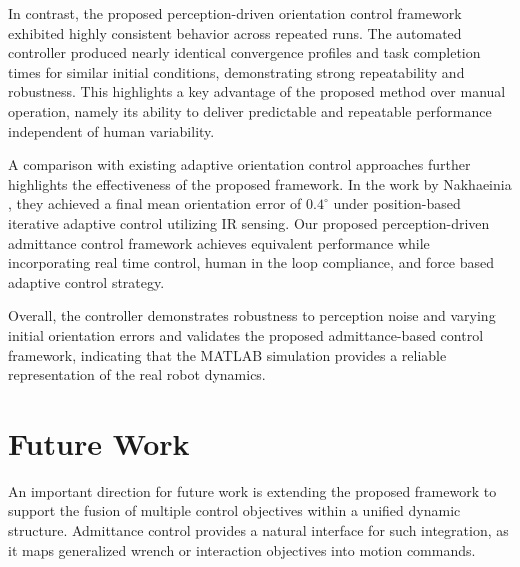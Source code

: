 \documentclass[journal]{IEEEtran}
\begin{document}
In contrast, the proposed perception-driven orientation control framework exhibited highly consistent behavior across repeated runs. The automated controller produced nearly identical convergence profiles and task completion times for similar initial conditions, demonstrating strong repeatability and robustness. This highlights a key advantage of the proposed method over manual operation, namely its ability to deliver predictable and repeatable performance independent of human variability.

A comparison with existing adaptive orientation control approaches further highlights the effectiveness of the proposed framework. In the work by Nakhaeinia \cite{nakhaeinia2018hybrid}, they achieved a final mean orientation error of $0.4^\circ$ under position-based iterative adaptive control utilizing IR sensing. Our proposed perception-driven admittance control framework achieves equivalent performance while incorporating real time control, human in the loop compliance, and force based adaptive control strategy.

 
 
Overall, the controller demonstrates robustness to perception noise and varying initial orientation errors and validates the proposed admittance-based control framework, indicating that the MATLAB simulation provides a reliable representation of the real robot dynamics.


\section{Future Work}

An important direction for future work is extending the proposed framework to support the fusion of multiple control objectives within a unified dynamic structure. Admittance control provides a natural interface for such integration, as it maps generalized wrench or interaction objectives into motion commands.
\end{document}

